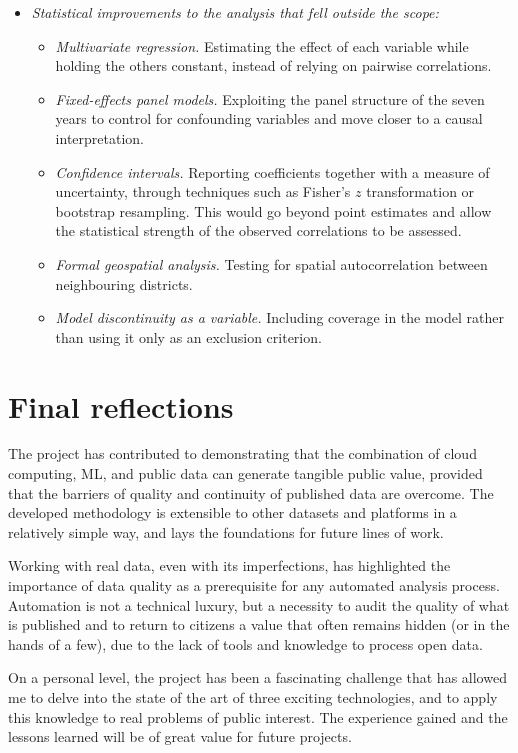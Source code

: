 \begin{itemize}
\begin{itemize}
		\item \emph{Statistical improvements to the analysis that fell outside the scope:}
		\begin{itemize}
			\item \emph{Multivariate regression.} Estimating the effect of each variable while holding the others constant, instead of relying on pairwise correlations.
			
			\item \emph{Fixed-effects panel models.} Exploiting the panel structure of the seven years to control for confounding variables and move closer to a causal interpretation.
			
			\item \emph{Confidence intervals.} Reporting coefficients together with a measure of uncertainty, through techniques such as Fisher's $z$ transformation or bootstrap resampling. This would go beyond point estimates and allow the statistical strength of the observed correlations to be assessed.
			
			\item \emph{Formal geospatial analysis.} Testing for spatial autocorrelation between neighbouring districts.
			
			\item \emph{Model discontinuity as a variable.} Including coverage in the model rather than using it only as an exclusion criterion.
		\end{itemize}
	\end{itemize}
\end{itemize}

\section{Final reflections}

The project has contributed to demonstrating that the combination of cloud computing, ML, and public data can generate tangible public value, provided that the barriers of quality and continuity of published data are overcome. The developed methodology is extensible to other datasets and platforms in a relatively simple way, and lays the foundations for future lines of work.

Working with real data, even with its imperfections, has highlighted the importance of data quality as a prerequisite for any automated analysis process. Automation is not a technical luxury, but a necessity to audit the quality of what is published and to return to citizens a value that often remains hidden (or in the hands of a few), due to the lack of tools and knowledge to process open data.

On a personal level, the project has been a fascinating challenge that has allowed me to delve into the state of the art of three exciting technologies, and to apply this knowledge to real problems of public interest. The experience gained and the lessons learned will be of great value for future projects.

